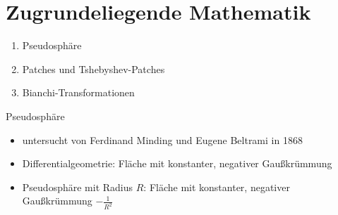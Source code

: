 \documentclass[12pt]{beamer}
\begin{document}
\section{Zugrundeliegende Mathematik}
\begin{frame}
\begin{enumerate}
\item Pseudosphäre
\item Patches und Tshebyshev-Patches
\item Bianchi-Transformationen
\end{enumerate}
\end{frame}

\begin{frame}{Pseudosphäre}

\begin{itemize}
\item untersucht von Ferdinand Minding und Eugene Beltrami in 1868
\item Differentialgeometrie: Fläche mit konstanter, negativer Gaußkrümmung
\item Pseudosphäre mit Radius $R$: Fläche mit konstanter, negativer Gaußkrümmung $-\frac{1}{R^2}$ \cite{pseudo_mathcurve}
\end{itemize}

\end{frame}
\end{document}
